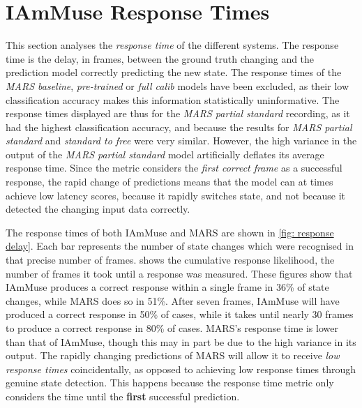 \section{IAmMuse Response Times}
\label{section: evaluation - response times}

This section analyses the \textit{response time} of the different systems.
The response time is the delay, in frames, between the ground truth changing and the prediction model correctly predicting the new state.
The response times of the \textit{MARS baseline}, \textit{pre-trained} or \textit{full calib} models have been excluded, as their low classification accuracy makes this information statistically uninformative.
The response times displayed are thus for the \textit{MARS partial standard} recording, as it had the highest classification accuracy, and because the results for \textit{MARS partial standard} and \textit{standard to free} were very similar.
However, the high variance in the output of the \textit{MARS partial standard} model artificially deflates its average response time.
Since the metric considers the \textit{first correct frame} as a successful response, the rapid change of predictions means that the model can at times achieve low latency scores, because it rapidly switches state, and not because it detected the changing input data correctly.

The response times of both IAmMuse and MARS are shown in \cref{fig: response delay}.
Each bar represents the number of state changes which were recognised in that precise number of frames.
 shows the cumulative response likelihood, the number of frames it took until a response was measured.
These figures show that IAmMuse produces a correct response within a single frame in 36\% of state changes, while MARS does so in 51\%.
After seven frames, IAmMuse will have produced a correct response in 50\% of cases, while it takes until nearly 30 frames to produce a correct response in 80\% of cases.
MARS's response time is lower than that of IAmMuse, though this may in part be due to the high variance in its output.
The rapidly changing predictions of MARS will allow it to receive \textit{low response times} coincidentally, as opposed to achieving low response times through genuine state detection.
This happens because the response time metric only considers the time until the \textbf{first} successful prediction.

